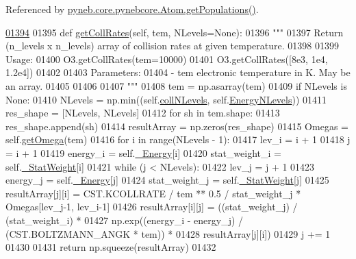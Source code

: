 Referenced by \hyperlink{pynebcore_8py_source_l01562}{pyneb.\-core.\-pynebcore.\-Atom.\-get\-Populations()}.


\begin{DoxyCode}
\hypertarget{classpyneb_1_1core_1_1pynebcore_1_1_atom_l01394}{}\hyperlink{classpyneb_1_1core_1_1pynebcore_1_1_atom_a34711ea989baf7bde752a68255d32098}{01394} 
01395     \textcolor{keyword}{def }\hyperlink{classpyneb_1_1core_1_1pynebcore_1_1_atom_a34711ea989baf7bde752a68255d32098}{getCollRates}(self, tem, NLevels=None):
01396         \textcolor{stringliteral}{"""}
01397 \textcolor{stringliteral}{        Return (n\_levels x n\_levels) array of collision rates at given temperature. }
01398 \textcolor{stringliteral}{        }
01399 \textcolor{stringliteral}{        Usage:}
01400 \textcolor{stringliteral}{            O3.getCollRates(tem=10000)}
01401 \textcolor{stringliteral}{            O3.getCollRates([8e3, 1e4, 1.2e4])}
01402 \textcolor{stringliteral}{        }
01403 \textcolor{stringliteral}{        Parameters:}
01404 \textcolor{stringliteral}{            - tem     electronic temperature in K. May be an array.}
01405 \textcolor{stringliteral}{}
01406 \textcolor{stringliteral}{}
01407 \textcolor{stringliteral}{        """}
01408         tem = np.asarray(tem)
01409         \textcolor{keywordflow}{if} NLevels \textcolor{keywordflow}{is} \textcolor{keywordtype}{None}:
01410             NLevels = np.min((self.\hyperlink{classpyneb_1_1core_1_1pynebcore_1_1_atom_a8beaa0244d575054b3e2748a5e00d8db}{collNLevels}, self.\hyperlink{classpyneb_1_1core_1_1pynebcore_1_1_atom_a03277bf57e7056ec2199cc89f2a007aa}{EnergyNLevels}))
01411         res\_shape = [NLevels, NLevels]
01412         \textcolor{keywordflow}{for} sh \textcolor{keywordflow}{in} tem.shape:
01413             res\_shape.append(sh)
01414         resultArray = np.zeros(res\_shape)
01415         Omegas = self.\hyperlink{classpyneb_1_1core_1_1pynebcore_1_1_atom_ae133eed382e284df01f2183da341534b}{getOmega}(tem)
01416         \textcolor{keywordflow}{for} i \textcolor{keywordflow}{in} range(NLevels - 1):
01417             lev\_i = i + 1
01418             j = i + 1
01419             energy\_i = self.\hyperlink{classpyneb_1_1core_1_1pynebcore_1_1_atom_a52e68715246d258bf0a14f4bd06e89e4}{\_Energy}[i]
01420             stat\_weight\_i = self.\hyperlink{classpyneb_1_1core_1_1pynebcore_1_1_atom_a1e76c66b89eb327aeb4cdb1d8bd46fb5}{\_StatWeight}[i]
01421             \textcolor{keywordflow}{while} (j < NLevels):
01422                 lev\_j = j + 1 
01423                 energy\_j = self.\hyperlink{classpyneb_1_1core_1_1pynebcore_1_1_atom_a52e68715246d258bf0a14f4bd06e89e4}{\_Energy}[j]
01424                 stat\_weight\_j = self.\hyperlink{classpyneb_1_1core_1_1pynebcore_1_1_atom_a1e76c66b89eb327aeb4cdb1d8bd46fb5}{\_StatWeight}[j]
01425                 resultArray[j][i] = CST.KCOLLRATE / tem ** 0.5 / stat\_weight\_j * Omegas[lev\_j-1, lev\_i-1]
01426                 resultArray[i][j] = ((stat\_weight\_j) / (stat\_weight\_i) * 
01427                                       np.exp((energy\_i - energy\_j) / (CST.BOLTZMANN\_ANGK * tem)) * 
01428                                       resultArray[j][i])
01429                 j += 1
01430         
01431         \textcolor{keywordflow}{return} np.squeeze(resultArray)
01432 
    

\end{DoxyCode}
